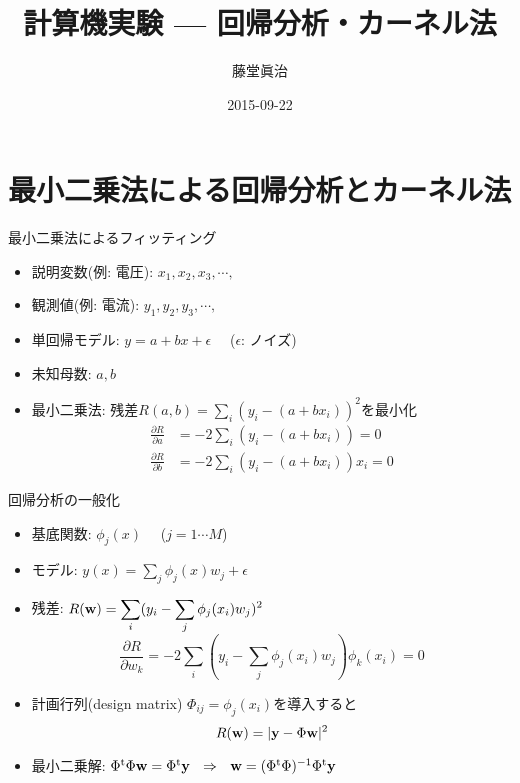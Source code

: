 \documentclass[dvipdfmx]{beamer}
\title{計算機実験 --- 回帰分析・カーネル法}
\author{藤堂眞治}
\date{2015-09-22}
\begin{document}

\begin{frame}
  \titlepage
  \tableofcontents
\end{frame}

\section{最小二乗法による回帰分析とカーネル法}

\begin{frame}[t,fragile]{最小二乗法によるフィッティング}
  \begin{itemize}
    \setlength{\itemsep}{1em}
  \item 説明変数(例: 電圧): $x_1,x_2,x_3,\cdots,$
  \item 観測値(例: 電流): $y_1,y_2,y_3,\cdots,$
  \item 単回帰モデル: $y=a+bx+\epsilon$ \ \ ($\epsilon$: ノイズ)
  \item 未知母数: $a,b$
  \item 最小二乗法:
    残差$\displaystyle R(a,b) = \sum_i (y_i - (a+bx_i))^2$を最小化
    \[
    \begin{split}
      \frac{\partial R}{\partial a} &= - 2 \sum_i (y_i - (a+bx_i)) = 0 \\
      \frac{\partial R}{\partial b} &= - 2 \sum_i (y_i - (a+bx_i))x_i = 0
    \end{split}
    \]
  \end{itemize}
\end{frame}

\begin{frame}[t,fragile]{回帰分析の一般化}
  \begin{itemize}
    \setlength{\itemsep}{1em}
  \item 基底関数: $\phi_j(x)$ \ \ ($j=1 \cdots M$)
  \item モデル: $\displaystyle y(x) = \sum_j \phi_j(x) w_j + \epsilon$
  \item 残差: $\displaystyle R({\bf w}) = \sum_i (y_i - \sum_j \phi_j(x_i) w_j)^2$
    \[
    \frac{\partial R}{\partial w_k} = -2 \sum_i (y_i - \sum_j \phi_j(x_i) w_j) \phi_k(x_i) = 0
    \]
  \item 計画行列(design matrix) $\Phi_{ij} = \phi_j(x_i)$を導入すると
    \[
    R({\bf w}) = | {\bf y} - \Phi {\bf w} |^2
    \]
  \item 最小二乗解: $\Phi^{\rm t} \Phi {\bf w} = \Phi^{\rm t} {\bf y} \ \ \Rightarrow \ \
{\bf w} = (\Phi^{\rm t} \Phi)^{-1}\Phi^{\rm t} {\bf y}$
  \end{itemize}
\end{frame}
\end{document}
